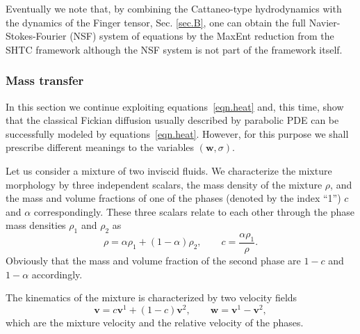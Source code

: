 \documentclass[twoside]{article}
\newcommand{\vv}{{\boldsymbol{v}}}
\newcommand{\ww}{{\boldsymbol{w}}}
\begin{document}
Eventually we note that, by combining the Cattaneo-type 
hydrodynamics with the dynamics of the Finger tensor, Sec. \ref{sec.B}, one 
can obtain the full Navier-Stokes-Fourier (NSF) system of equations by the 
MaxEnt reduction from the SHTC framework although the NSF system is not part of 
the framework itself. 


\subsubsection{Mass transfer}\label{sec.mass.transfer}


In this section we continue exploiting equations~\eqref{eqn.heat} and, this 
time, show that 
the classical Fickian diffusion usually described by parabolic PDE can be 
successfully modeled by equations~\eqref{eqn.heat}. However, for this purpose 
we shall prescribe different meanings to the variables $ (\ww,\sigma) $.

Let us consider a mixture of two inviscid fluids. We characterize the mixture 
morphology by 
three independent scalars, the mass density of the mixture $ \rho $, and the 
mass and volume fractions of one of the phases (denoted by the index 
``1'') $ c $ and $ \alpha  $ 
correspondingly. These three scalars relate to each other through the phase 
mass densities $ \rho_1 $ and $ \rho_2 $ as
\begin{equation}\label{eqn.examps.morphology}
\rho = \alpha \rho_1 + (1-\alpha)\rho_2, \qquad c = \frac{\alpha \rho_1}{\rho}.
\end{equation}
Obviously that the mass and volume fraction of the second phase are $ 1-c $ and 
$ 1-\alpha $ accordingly.

The kinematics of the mixture is characterized by two velocity fields
\begin{equation}
\vv = c \vv^1 + (1-c)\vv^2, \qquad \ww = \vv^1 - \vv^2,
\end{equation} 
which are the mixture velocity and the relative velocity of the phases. 
\end{document}

